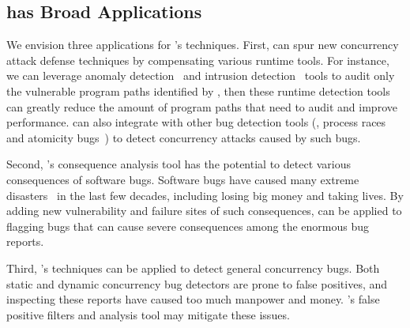 


\subsection{\xxx has Broad Applications}\label{sec:apps}

We envision three applications for \xxx's techniques. First, \xxx can 
spur new concurrency attack defense techniques by compensating various runtime 
tools. For instance, we can leverage anomaly detection~\cite{schonberg:pldi89, 
taskrecycling:ppopp90,diduce:icse02} and intrusion 
detection~\cite{hofmeyr:syscall:ids, wagner:syscall:ids, wagner:intrusion} tools 
to audit only the vulnerable program paths identified by \xxx, then these 
runtime detection tools can greatly reduce the amount of program paths that need 
to audit and improve performance. \xxx can also integrate with other bug 
detection tools (\eg, process races~\cite{racepro:sosp11} and atomicity 
bugs~\cite{ctrigger:asplos09}) to detect concurrency attacks caused by such 
bugs.

Second, \xxx's consequence analysis tool has the potential to detect various 
consequences of software bugs. Software bugs have 
caused many extreme disasters~\cite{10-historical-bug-consequences, 
10-epic-software-bugs} in the last few decades, including losing big money and 
taking lives. By adding new vulnerability and failure sites of such 
consequences, \xxx can be applied to flagging bugs that can cause severe 
consequences among the enormous bug reports.

Third, \xxx's techniques can be applied to detect general concurrency bugs. 
Both static and dynamic concurrency bug detectors are prone to false positives, 
and inspecting these reports have caused too much manpower and money. 
\xxx's false positive filters and analysis tool may mitigate these issues.
